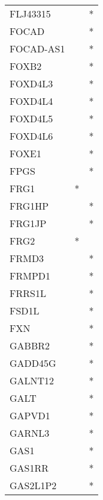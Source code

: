 \begin{longtable}{lcc}
FLJ43315              &                &          * \\
FOCAD                 &                &          * \\
FOCAD-AS1             &                &          * \\
FOXB2                 &                &          * \\
FOXD4L3               &                &          * \\
FOXD4L4               &                &          * \\
FOXD4L5               &                &          * \\
FOXD4L6               &                &          * \\
FOXE1                 &                &          * \\
FPGS                  &                &          * \\
FRG1                  &              * &            \\
FRG1HP                &                &          * \\
FRG1JP                &                &          * \\
FRG2                  &              * &            \\
FRMD3                 &                &          * \\
FRMPD1                &                &          * \\
FRRS1L                &                &          * \\
FSD1L                 &                &          * \\
FXN                   &                &          * \\
GABBR2                &                &          * \\
GADD45G               &                &          * \\
GALNT12               &                &          * \\
GALT                  &                &          * \\
GAPVD1                &                &          * \\
GARNL3                &                &          * \\
GAS1                  &                &          * \\
GAS1RR                &                &          * \\
GAS2L1P2              &                &          * \\

\end{longtable}
